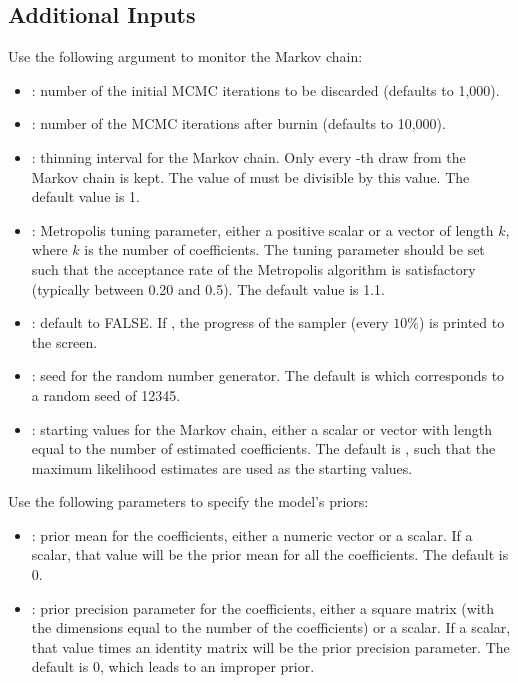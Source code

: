 \documentclass[letterpaper,10pt,english]{sphinxmanual}
\begin{document}
\subsection{Additional Inputs}
\label{vignette:id91}
Use the following argument to monitor the Markov chain:
\begin{itemize}
\item {} 
: number of the initial MCMC iterations to be discarded
(defaults to 1,000).

\item {} 
: number of the MCMC iterations after burnin (defaults to
10,000).

\item {} 
: thinning interval for the Markov chain. Only every
-th draw from the Markov chain is kept. The value of 
must be divisible by this value. The default value is 1.

\item {} 
: Metropolis tuning parameter, either a positive scalar or a
vector of length \(k\), where \(k\) is the number of
coefficients. The tuning parameter should be set such that the
acceptance rate of the Metropolis algorithm is satisfactory
(typically between 0.20 and 0.5). The default value is 1.1.

\item {} 
: default to FALSE. If , the progress of the
sampler (every \(10\%\)) is printed to the screen.

\item {} 
: seed for the random number generator. The default is 
which corresponds to a random seed of 12345.

\item {} 
: starting values for the Markov chain, either a scalar
or vector with length equal to the number of estimated coefficients.
The default is , such that the maximum likelihood estimates are
used as the starting values.

\end{itemize}

Use the following parameters to specify the model’s priors:
\begin{itemize}
\item {} 
: prior mean for the coefficients, either a numeric vector or a
scalar. If a scalar, that value will be the prior mean for all the
coefficients. The default is 0.

\item {} 
: prior precision parameter for the coefficients, either a
square matrix (with the dimensions equal to the number of the
coefficients) or a scalar. If a scalar, that value times an identity
matrix will be the prior precision parameter. The default is 0, which
leads to an improper prior.

\end{itemize}
\end{document}
